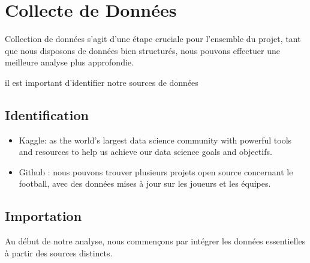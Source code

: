 \documentclass[
  6pt,
]{article}
\begin{document}
\section{Collecte de Données}\label{collecte-de-donnuxe9es}

Collection de données s'agit d'une étape cruciale pour l'ensemble du
projet, tant que nous disposons de données bien structurés, nous pouvons
effectuer une meilleure analyse plus approfondie.

il est important d'identifier notre sources de données

\subsection{Identification}\label{identification}

\begin{itemize}
\item
  Kaggle: as the world's largest data science community with powerful
  tools and resources to help us achieve our data science goals and
  objectifs.
\item
  Github : nous pouvons trouver plusieurs projets open source concernant
  le football, avec des données mises à jour sur les joueurs et les
  équipes.
\end{itemize}

\subsection{Importation}\label{importation}

Au début de notre analyse, nous commençons par intégrer les données
essentielles à partir des sources distincts.
\end{document}

